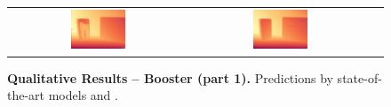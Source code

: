 \begin{figure}[h]
\begin{tabular}{ccc}
        \includegraphics[width=0.32\textwidth]{imgs/booster/stereo/Selective/8.jpg} &
        \includegraphics[width=0.32\textwidth]{imgs/booster/stereo/Ours/8.jpg} \\ 

    \end{tabular}\vspace{-0.3cm}
    \caption{\textbf{Qualitative Results -- Booster (part 1).} Predictions by state-of-the-art models and \method.}
    \label{fig:qual_booster_1}\vspace{-0.3cm}
\end{figure}

